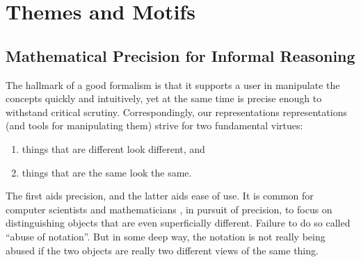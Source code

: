 \section{Themes and Motifs}



\subsection{Mathematical Precision for Informal Reasoning}

%
The hallmark of a good formalism is that it supports a user in manipulate the concepts quickly and intuitively, yet at the same time is precise enough to withstand critical scrutiny.
%
Correspondingly, our representations representations (and tools for manipulating them)
    strive for two fundamental virtues:
\begin{enumerate}[nosep]
    \item things that are different look different, and
    \item things that are the same look the same. 
\end{enumerate}
The first aids precision, and the latter aids ease of use. 
It is common for computer scientists and mathematicians 
    \unskip,
    in pursuit of precision,
    to focus on distinguishing objects that are even superficially different.  
Failure to do so called ``abuse of notation''. 
%
But in some deep way, the notation is not really being abused if the two objects are really two different views of the same thing.

